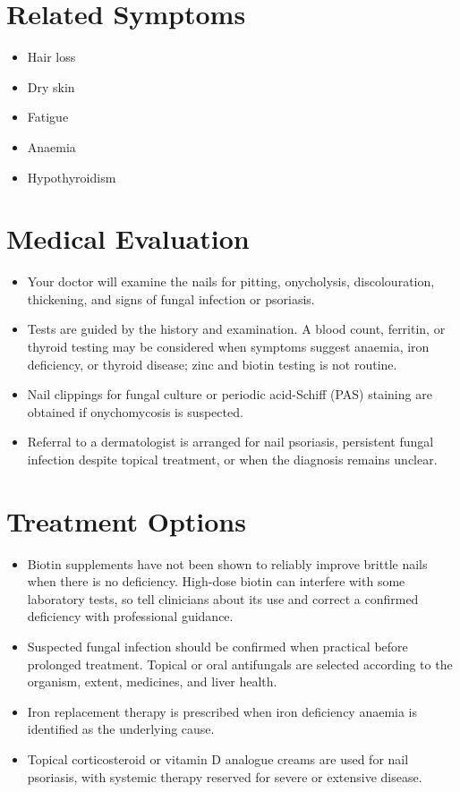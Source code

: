 \section*{Related Symptoms}
\begin{itemize}
 \item Hair loss
 \item Dry skin
 \item Fatigue
 \item Anaemia
 \item Hypothyroidism
\end{itemize}


\section*{Medical Evaluation}
\begin{itemize}
 \item Your doctor will examine the nails for pitting, onycholysis, discolouration, thickening, and signs of fungal infection or psoriasis.
 \item Tests are guided by the history and examination. A blood count, ferritin, or thyroid testing may be considered when symptoms suggest anaemia, iron deficiency, or thyroid disease; zinc and biotin testing is not routine.
 \item Nail clippings for fungal culture or periodic acid-Schiff (PAS) staining are obtained if onychomycosis is suspected.
 \item Referral to a dermatologist is arranged for nail psoriasis, persistent fungal infection despite topical treatment, or when the diagnosis remains unclear.
\end{itemize}

\section*{Treatment Options}
\begin{itemize}
 \item Biotin supplements have not been shown to reliably improve brittle nails when there is no deficiency. High-dose biotin can interfere with some laboratory tests, so tell clinicians about its use and correct a confirmed deficiency with professional guidance.
 \item Suspected fungal infection should be confirmed when practical before prolonged treatment. Topical or oral antifungals are selected according to the organism, extent, medicines, and liver health.
 \item Iron replacement therapy is prescribed when iron deficiency anaemia is identified as the underlying cause.
 \item Topical corticosteroid or vitamin D analogue creams are used for nail psoriasis, with systemic therapy reserved for severe or extensive disease.
\end{itemize}

